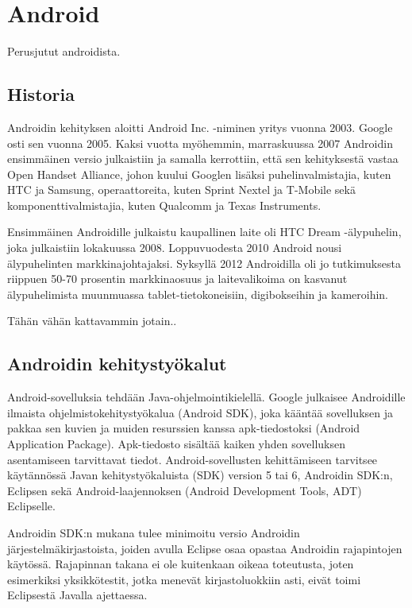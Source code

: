 \section{Android}

Perusjutut androidista.

\subsection{Historia}

Androidin kehityksen aloitti Android Inc. -niminen yritys vuonna 2003. Google osti sen vuonna 2005. Kaksi vuotta myöhemmin, marraskuussa 2007 Androidin ensimmäinen versio julkaistiin ja samalla kerrottiin, että sen kehityksestä vastaa Open Handset Alliance, johon kuului Googlen lisäksi puhelinvalmistajia, kuten HTC ja Samsung, operaattoreita, kuten Sprint Nextel ja T-Mobile sekä komponenttivalmistajia, kuten Qualcomm ja Texas Instruments.

Ensimmäinen Androidille julkaistu kaupallinen laite oli HTC Dream -älypuhelin, joka julkaistiin lokakuussa 2008.
Loppuvuodesta 2010 Android nousi älypuhelinten markkinajohtajaksi. Syksyllä 2012 Androidilla oli jo tutkimuksesta riippuen 50-70 prosentin markkinaosuus ja laitevalikoima on kasvanut älypuhelimista muunmuassa tablet-tietokoneisiin, digibokseihin ja kameroihin.\cite{wikiandroid}

Tähän vähän kattavammin jotain..

\subsection{Androidin kehitystyökalut}

Android-sovelluksia tehdään Java-ohjelmointikielellä. Google julkaisee Androidille ilmaista ohjelmistokehitystyökalua (Android SDK), joka kääntää sovelluksen ja pakkaa sen kuvien ja muiden resurssien kanssa apk-tiedostoksi (Android Application Package). Apk-tiedosto sisältää kaiken yhden sovelluksen asentamiseen tarvittavat tiedot. Android-sovellusten kehittämiseen tarvitsee käytännössä Javan kehitystyökaluista (SDK) version 5 tai 6, Androidin SDK:n, Eclipsen sekä Android-laajennoksen (Android Development Tools, ADT) Eclipselle.

Androidin SDK:n mukana tulee minimoitu versio Androidin järjestelmäkirjastoista, joiden avulla Eclipse osaa opastaa Androidin rajapintojen käytössä. Rajapinnan takana ei ole kuitenkaan oikeaa toteutusta, joten esimerkiksi yksikkötestit, jotka menevät kirjastoluokkiin asti, eivät toimi Eclipsestä Javalla ajettaessa.

